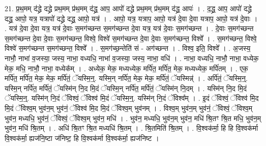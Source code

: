 \documentclass[17pt]{extarticle}
\begin{document}
21. प्र॒थ॒मम् द॑द्ध्रे दद्ध्रे प्रथ॒मम् प्र॑थ॒मम् द॑द्ध्र॒ आप॒ आपो॑ दद्ध्रे प्रथ॒मम् प्र॑थ॒मम् द॑द्ध्र॒ आपः॑ । . द॒द्ध्र॒ आप॒ आपो॑ दद्ध्रे दद्ध्र॒ आपो॒ यत्र॒ यत्रापो॑ दद्ध्रे दद्ध्र॒ आपो॒ यत्र॑ । . आपो॒ यत्र॒ यत्राप॒ आपो॒ यत्र॑ दे॒वा दे॒वा यत्राप॒ आपो॒ यत्र॑ दे॒वाः । . यत्र॑ दे॒वा दे॒वा यत्र॒ यत्र॑ दे॒वाः स॒मग॑च्छन्त स॒मग॑च्छन्त दे॒वा यत्र॒ यत्र॑ दे॒वाः स॒मग॑च्छन्त । . दे॒वाः स॒मग॑च्छन्त स॒मग॑च्छन्त दे॒वा दे॒वाः स॒मग॑च्छन्त॒ विश्वे॒ विश्वे॑ स॒मग॑च्छन्त दे॒वा दे॒वाः स॒मग॑च्छन्त॒ विश्वे᳚ । . स॒मग॑च्छन्त॒ विश्वे॒ विश्वे॑ स॒मग॑च्छन्त स॒मग॑च्छन्त॒ विश्वे᳚ । . स॒मग॑च्छ॒न्तेति॑ सं - अग॑च्छन्त । . विश्व॒ इति॒ विश्वे᳚ । . अ॒जस्य॒ नाभौ॒ नाभा॑ व॒जस्या॒ जस्य॒ नाभा॒ वध्यधि॒ नाभा॑ व॒जस्या॒ जस्य॒ नाभा॒ वधि॑ । . नाभा॒ वध्यधि॒ नाभौ॒ नाभा॒ वध्येक॒ मेक॒ मधि॒ नाभौ॒ नाभा॒ वध्येक᳚म् । . अध्येक॒ मेक॒ मध्यध्येक॒ मर्पि॑त॒ मर्पि॑त॒ मेक॒ मध्यध्येक॒ मर्पि॑तम् । . एक॒ मर्पि॑त॒ मर्पि॑त॒ मेक॒ मेक॒ मर्पि॑तं॒ ॅयस्मि॒न्॒. यस्मि॒न् नर्पि॑त॒ मेक॒ मेक॒ मर्पि॑तं॒ ॅयस्मिन्न्॑ । . अर्पि॑तं॒ ॅयस्मि॒न्॒. यस्मि॒न् नर्पि॑त॒ मर्पि॑तं॒ ॅयस्मि॑न् नि॒द मि॒दं ॅयस्मि॒न् नर्पि॑त॒ मर्पि॑तं॒ ॅयस्मि॑न् नि॒दम् । . यस्मि॑न् नि॒द मि॒दं ॅयस्मि॒न्॒. यस्मि॑न् नि॒दं ॅविश्वं॒ ॅविश्व॑ मि॒दं ॅयस्मि॒न्॒. यस्मि॑न् नि॒दं ॅविश्व᳚म् । . इ॒दं ॅविश्वं॒ ॅविश्व॑ मि॒द मि॒दं ॅविश्व॒म् भुव॑न॒म् भुव॑नं॒ ॅविश्व॑ मि॒द मि॒दं ॅविश्व॒म् भुव॑नम् । . विश्व॒म् भुव॑न॒म् भुव॑नं॒ ॅविश्वं॒ ॅविश्व॒म् भुव॑न॒ मध्यधि॒ भुव॑नं॒ ॅविश्वं॒ ॅविश्व॒म् भुव॑न॒ मधि॑ । . भुव॑न॒ मध्यधि॒ भुव॑न॒म् भुव॑न॒ मधि॑ श्रि॒तꣳ श्रि॒त मधि॒ भुव॑न॒म् भुव॑न॒ मधि॑ श्रि॒तम् । . अधि॑ श्रि॒तꣳ श्रि॒त मध्यधि॑ श्रि॒तम् । . श्रि॒तमिति॑ श्रि॒तम् । . वि॒श्वक॑र्मा॒ हि हि वि॒श्वक॑र्मा वि॒श्वक॑र्मा॒ ह्यज॑नि॒ष्टा ज॑निष्ट॒ हि वि॒श्वक॑र्मा वि॒श्वक॑र्मा॒ ह्यज॑निष्ट । \newline
\end{document}
